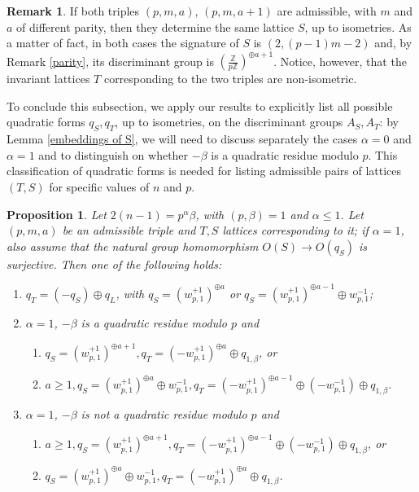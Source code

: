 \documentclass{amsart}
\newtheorem{prop}[theorem]{Proposition}
\theoremstyle{definition}
\newtheorem{rem}[theorem]{Remark}
\newcommand{\ra}{\rightarrow}
\newcommand{\IZ}{\mathbb{Z}}
\begin{document}
\begin{rem}
If both triples $(p,m,a)$, $(p,m,a+1)$ are admissible, with $m$ and $a$ of different parity, then they determine the same lattice $S$, up to isometries. As a matter of fact, in both cases the signature of $S$ is $(2, (p-1)m - 2)$ and, by Remark \ref{parity}, its discriminant group is $\left( \frac{\IZ}{p \IZ}\right)^{\oplus a+1}$. Notice, however, that the invariant lattices $T$ corresponding to the two triples are non-isometric.
\end{rem}

To conclude this subsection, we apply our results to explicitly list all possible quadratic forms $q_S, q_T$, up to isometries, on the discriminant groups $A_S, A_T$: by Lemma \ref{embeddings of S}, we will need to discuss separately the cases $\alpha = 0$ and $\alpha =1$ and to distinguish on whether $-\beta$ is a quadratic residue modulo $p$. This classification of quadratic forms is needed for listing admissible pairs of lattices $(T,S)$ for specific values of $n$ and $p$. 

\begin{prop}\label{prop: forms q_S and q_T}
Let $2(n-1) = p^\alpha \beta$, with $(p,\beta)=1$ and $\alpha \leq 1$. Let $(p,m,a)$ be an admissible triple and $T,S$ lattices corresponding to it; if $\alpha = 1$, also assume that the natural group homomorphism $O(S) \ra O(q_S)$ is surjective. Then one of the following holds:
\begin{enumerate}
\item[\textit{(i)}] $q_T=(-q_S) \oplus q_L$, with $q_S = \left( w^{+1}_{p,1} \right)^{\oplus a}$ or $q_S = \left( w^{+1}_{p,1} \right)^{\oplus a-1} \oplus w^{-1}_{p,1}$;
\item[\textit{(ii)}] $\alpha = 1$, $-\beta$ is a quadratic residue modulo $p$ and
\begin{enumerate}
\item $q_S = \left( w^{+1}_{p,1} \right)^{\oplus a+1}, q_T = \left( -w^{+1}_{p,1} \right)^{\oplus a} \oplus q_{1, \beta}$, or
\item $a \geq 1, q_S = \left( w^{+1}_{p,1} \right)^{\oplus a} \oplus w^{-1}_{p,1}, q_T = \left(- w^{+1}_{p,1} \right)^{\oplus a-1} \oplus (-w^{-1}_{p,1}) \oplus q_{1, \beta}$.
\end{enumerate}
\item[\textit{(iii)}] $\alpha = 1$, $-\beta$ is not a quadratic residue modulo $p$ and
\begin{enumerate}
\item $a \geq 1, q_S = \left( w^{+1}_{p,1} \right)^{\oplus a+1}, q_T = \left( -w^{+1}_{p,1} \right)^{\oplus a-1} \oplus (-w^{-1}_{p,1}) \oplus q_{1, \beta}$, or
\item $q_S = \left( w^{+1}_{p,1} \right)^{\oplus a} \oplus w^{-1}_{p,1}, q_T = \left( -w^{+1}_{p,1} \right)^{\oplus a} \oplus q_{1, \beta}$.
\end{enumerate}
\end{enumerate}
\end{prop}
\end{document}
